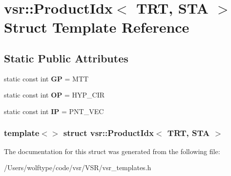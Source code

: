 \hypertarget{structvsr_1_1_product_idx_3_01_t_r_t_00_01_s_t_a_01_4}{\section{vsr\-:\-:Product\-Idx$<$ T\-R\-T, S\-T\-A $>$ Struct Template Reference}
\label{structvsr_1_1_product_idx_3_01_t_r_t_00_01_s_t_a_01_4}
}
\subsection*{Static Public Attributes}
\begin{DoxyCompactItemize}
\item 
\hypertarget{structvsr_1_1_product_idx_3_01_t_r_t_00_01_s_t_a_01_4_acc6a7d7ab263238699aa1464e0f437da}{static const int {\bfseries G\-P} = M\-T\-T}\label{structvsr_1_1_product_idx_3_01_t_r_t_00_01_s_t_a_01_4_acc6a7d7ab263238699aa1464e0f437da}

\item 
\hypertarget{structvsr_1_1_product_idx_3_01_t_r_t_00_01_s_t_a_01_4_ac43c35ac4b76f0137969b26034e18942}{static const int {\bfseries O\-P} = H\-Y\-P\-\_\-\-C\-I\-R}\label{structvsr_1_1_product_idx_3_01_t_r_t_00_01_s_t_a_01_4_ac43c35ac4b76f0137969b26034e18942}

\item 
\hypertarget{structvsr_1_1_product_idx_3_01_t_r_t_00_01_s_t_a_01_4_a5dc6774f45dee64f8c6b878ede845530}{static const int {\bfseries I\-P} = P\-N\-T\-\_\-\-V\-E\-C}\label{structvsr_1_1_product_idx_3_01_t_r_t_00_01_s_t_a_01_4_a5dc6774f45dee64f8c6b878ede845530}

\end{DoxyCompactItemize}
\subsubsection*{template$<$$>$ struct vsr\-::\-Product\-Idx$<$ T\-R\-T, S\-T\-A $>$}



The documentation for this struct was generated from the following file\-:\begin{DoxyCompactItemize}
\item 
/\-Users/wolftype/code/vsr/\-V\-S\-R/vsr\-\_\-templates.\-h\end{DoxyCompactItemize}
